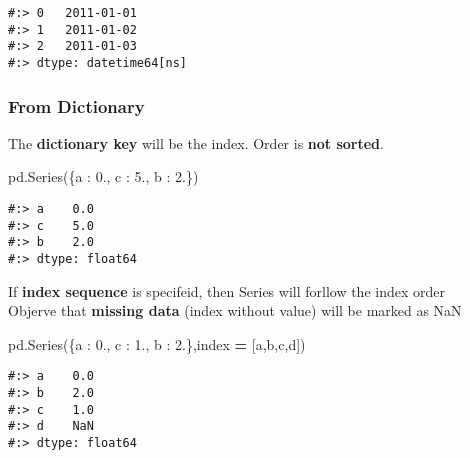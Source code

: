 \documentclass[
]{book}
\newenvironment{Shaded}{\begin{snugshade}}{\end{snugshade}}
\newcommand{\FloatTok}[1]{\textcolor[rgb]{0.06,0.06,0.06}{#1}}
\newcommand{\NormalTok}[1]{#1}
\newcommand{\OperatorTok}[1]{\textcolor[rgb]{0.43,0.43,0.43}{\textbf{#1}}}
\newcommand{\StringTok}[1]{\textcolor[rgb]{0.5,0.5,0.5}{#1}}
\begin{document}
\begin{verbatim}
#:> 0   2011-01-01
#:> 1   2011-01-02
#:> 2   2011-01-03
#:> dtype: datetime64[ns]
\end{verbatim}

\hypertarget{from-dictionary}{%
\subsubsection{From Dictionary}\label{from-dictionary}}

The \textbf{dictionary key} will be the index. Order is \textbf{not sorted}.

\begin{Shaded}
\begin{Highlighting}[]
\NormalTok{pd.Series(\{}\StringTok{\textquotesingle{}a\textquotesingle{}}\NormalTok{ : }\FloatTok{0.}\NormalTok{, }\StringTok{\textquotesingle{}c\textquotesingle{}}\NormalTok{ : }\FloatTok{5.}\NormalTok{, }\StringTok{\textquotesingle{}b\textquotesingle{}}\NormalTok{ : }\FloatTok{2.}\NormalTok{\})}
\end{Highlighting}
\end{Shaded}

\begin{verbatim}
#:> a    0.0
#:> c    5.0
#:> b    2.0
#:> dtype: float64
\end{verbatim}

If \textbf{index sequence} is specifeid, then Series will forllow the index order\\
Objerve that \textbf{missing data} (index without value) will be marked as NaN

\begin{Shaded}
\begin{Highlighting}[]
\NormalTok{pd.Series(\{}\StringTok{\textquotesingle{}a\textquotesingle{}}\NormalTok{ : }\FloatTok{0.}\NormalTok{, }\StringTok{\textquotesingle{}c\textquotesingle{}}\NormalTok{ : }\FloatTok{1.}\NormalTok{, }\StringTok{\textquotesingle{}b\textquotesingle{}}\NormalTok{ : }\FloatTok{2.}\NormalTok{\},index }\OperatorTok{=}\NormalTok{ [}\StringTok{\textquotesingle{}a\textquotesingle{}}\NormalTok{,}\StringTok{\textquotesingle{}b\textquotesingle{}}\NormalTok{,}\StringTok{\textquotesingle{}c\textquotesingle{}}\NormalTok{,}\StringTok{\textquotesingle{}d\textquotesingle{}}\NormalTok{])}
\end{Highlighting}
\end{Shaded}

\begin{verbatim}
#:> a    0.0
#:> b    2.0
#:> c    1.0
#:> d    NaN
#:> dtype: float64
\end{verbatim}
\end{document}
